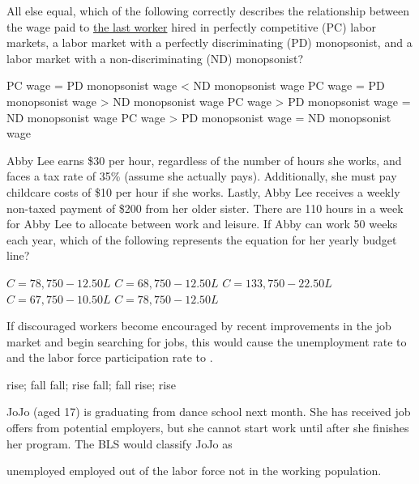 \documentclass[addpoints,11pt]{exam}
\theoremstyle{definition}
\newcommand{\blank}[0]{\underline{\hspace{3cm}}}
\begin{document}
\begin{questions}
\question All else equal, which of the following correctly describes the relationship between the wage paid to \underline{the last worker} hired in perfectly competitive (PC) labor markets, a labor market with a perfectly discriminating (PD) monopsonist, and a labor market with a non-discriminating (ND) monopsonist?


\begin{choices}
	\choice PC wage = PD monopsonist wage < ND monopsonist wage
	\CorrectChoice PC wage = PD monopsonist wage > ND monopsonist wage
	\choice PC wage > PD monopsonist wage = ND monopsonist wage
	\choice PC wage > PD monopsonist wage = ND monopsonist wage
\end{choices}

\question Abby Lee earns \$30 per hour, regardless of the number of hours she works, and faces a tax rate of 35\% (assume she actually pays). Additionally, she must pay childcare costs of \$10 per hour if she works. Lastly, Abby Lee receives a weekly non-taxed payment of \$200 from her older sister. There are 110 hours in a week for Abby Lee to allocate between work and leisure. If Abby can work 50 weeks each year, which of the following represents the equation for her yearly budget line?

\begin{choices}
	\CorrectChoice $C = 78,750 - 12.50L$
	\choice $C = 68,750 - 12.50L$
	\choice $C = 133,750 - 22.50L$
	\choice $C = 67,750 - 10.50L$
	\choice $C = 78,750 - 12.50L$
\end{choices}

\newpage

\question If discouraged workers become encouraged by recent improvements in the job market and begin searching for jobs, this would cause the unemployment rate to \blank and the labor force participation rate to \blank. 

\begin{choices}
	\choice rise; fall
	\choice fall; rise
	\choice fall; fall
	\CorrectChoice rise; rise
\end{choices}

\question JoJo (aged 17) is graduating from dance school next month. She has received job offers from potential employers, but she cannot start work until after she finishes her program. The BLS would classify JoJo as

\begin{choices}
	\choice unemployed
	\choice employed
	\CorrectChoice out of the labor force
	\choice not in the working population.
\end{choices}


\end{questions}
\end{document}
